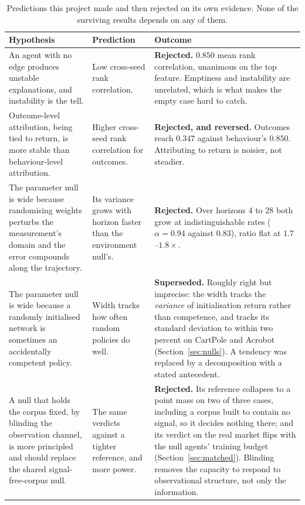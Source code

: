 \documentclass[10pt,twocolumn]{article}
\begin{document}
\begin{table}[!tp]
\centering\small
\caption{Predictions this project made and then rejected on its own evidence.
None of the surviving results depends on any of them.}
\label{tab:rejected}
\begin{tabular}{p{}p{}p{}}
\toprule
Hypothesis & Prediction & Outcome \\
\midrule
An agent with no edge produces unstable explanations, and instability is the
tell. &
Low cross-seed rank correlation. &
\textbf{Rejected.} $0.850$ mean rank correlation, unanimous on the top feature.
Emptiness and instability are unrelated, which is what makes the empty case hard
to catch. \\
\addlinespace
Outcome-level attribution, being tied to return, is more stable than
behaviour-level attribution. &
Higher cross-seed rank correlation for outcomes. &
\textbf{Rejected, and reversed.} Outcomes reach $0.347$ against behaviour's
$0.850$. Attributing to return is noisier, not steadier. \\
\addlinespace
The parameter null is wide because randomising weights perturbs the
measurement's domain and the error compounds along the trajectory. &
Its variance grows with horizon faster than the environment null's. &
\textbf{Rejected.} Over horizons 4 to 28 both grow at indistinguishable rates
($\alpha = 0.94$ against $0.83$), ratio flat at $1.7$--$1.8\times$. \\
\addlinespace
The parameter null is wide because a randomly initialised network is sometimes
an accidentally competent policy. &
Width tracks how often random policies do well. &
\textbf{Superseded.} Roughly right but imprecise: the width tracks the
\emph{variance} of initialisation return rather than competence, and tracks its
standard deviation to within two percent on CartPole and Acrobot
(Section~\ref{sec:nulls}). A
tendency was replaced by a decomposition with a stated antecedent. \\
\addlinespace
A null that holds the corpus fixed, by blinding the observation channel, is more
principled and should replace the shared signal-free-corpus null. &
The same verdicts against a tighter reference, and more power. &
\textbf{Rejected.} Its reference collapses to a point mass on two of three
cases, including a corpus built to contain no signal, so it decides nothing there; and its
verdict on the real market flips with the null agents' training budget
(Section~\ref{sec:matched}). Blinding removes the capacity to respond to
observational structure, not only the information. \\

\end{tabular}
\end{table}
\end{document}
